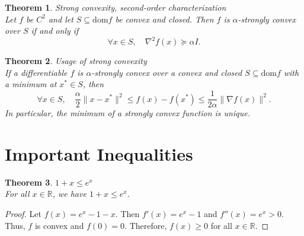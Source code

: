\documentclass[11pt]{book} %
\newtheorem{theorem}{Theorem}[section]
\begin{document}
\begin{theorem} { Strong convexity, second-order characterization}\\
Let \( f \) be \( C^2 \) and let \( S \subseteq \text{dom} f \) be convex and closed. Then \( f \) is \(\alpha\)-strongly convex over \( S \) if and only if
\[
\forall x \in S, \quad \nabla^2 f(x) \succeq \alpha I.
\]
\end{theorem}


\begin{theorem} {Usage of strong convexity } \\
If a differentiable \( f \) is \(\alpha\)-strongly convex over a convex and closed \( S \subseteq \text{dom} f \) with a minimum at \( x^* \in S \), then
\[
\forall x \in S, \quad \frac{\alpha}{2} \|x - x^*\|^2 \leq f(x) - f(x^*) \leq \frac{1}{2\alpha} \|\nabla f(x)\|^2.
\]
In particular, the minimum of a strongly convex function is unique.
\end{theorem}



\section{}




\section{Important Inequalities}

\begin{theorem}{$1 + x \leq e^x$} \\
For all $x \in \mathbb{R}$, we have $1 + x \leq e^x$.    
\end{theorem}

\begin{proof}
Let $f(x) = e^x - 1 - x$. Then $f'(x) = e^x - 1$ and $f''(x) = e^x > 0$. Thus, $f$ is convex and $f(0) = 0$. Therefore, $f(x) \geq 0$ for all $x \in \mathbb{R}$.
\end{proof}
\end{document}
